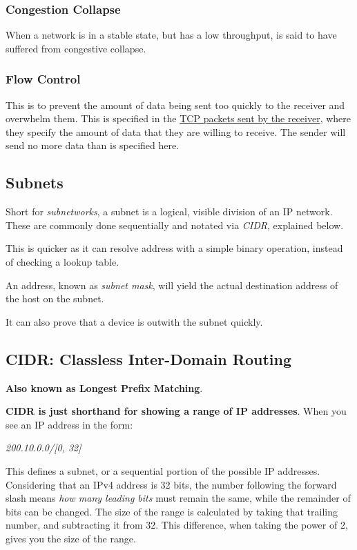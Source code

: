 \documentclass{article}
\begin{document}
\subsubsection{Congestion Collapse}

When a network is in a stable state, but has a low throughput, is said to have suffered from congestive collapse.

\subsubsection{Flow Control}

This is to prevent the amount of data being sent too quickly to the receiver and overwhelm them. This is specified in the \underline{TCP packets sent by the receiver}, where they specify the amount of data that they are willing to receive. The sender will send no more data than is specified here.


\subsection{Subnets}

Short for \textit{subnetworks}, a subnet is a logical, visible division of an IP network. These are commonly done sequentially and notated via \textit{CIDR}, explained below.

This is quicker as it can resolve address with a simple binary operation, instead of checking a lookup table.

An address, known as \textit{subnet mask}, will yield the actual destination address of the host on the subnet.

It can also prove that a device is outwith the subnet quickly.

\subsection{CIDR: Classless Inter-Domain Routing}

\textbf{Also known as Longest Prefix Matching}.

\textbf{CIDR is just shorthand for showing a range of IP addresses}. When you see
an IP address in the form:

\begin{center}
  \textit{200.10.0.0/[0, 32]}
\end{center}

This defines a subnet, or a sequential portion of the possible IP addresses. Considering that an IPv4
address is 32 bits, the number following the forward slash means \textit{how many leading bits} must remain the same, while the remainder of bits can be changed. The size of the range is calculated by taking that trailing number, and subtracting it from 32. This difference, when taking the power of 2, gives you the size of the range.
\end{document}
